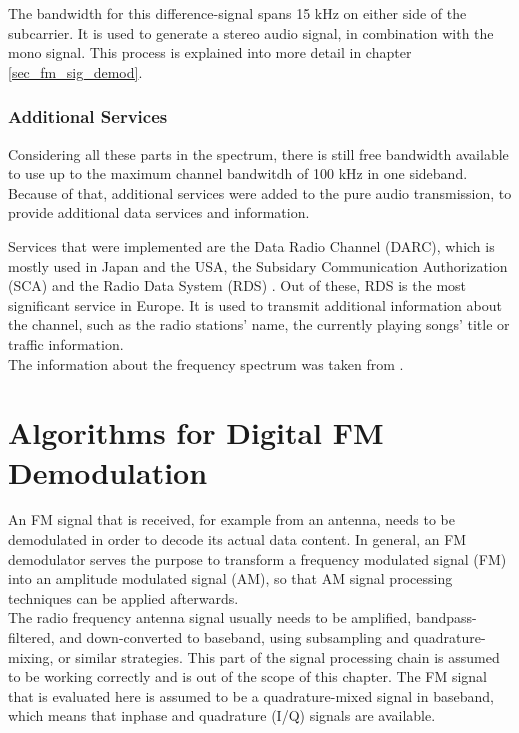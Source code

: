 The bandwidth for this difference-signal spans 15 kHz on either side of the subcarrier.
It is used to generate a stereo audio signal, in combination with the mono signal.
This process is explained into more detail in chapter \ref{sec_fm_sig_demod}.

\subsubsection{Additional Services}

Considering all these parts in the spectrum, there is still free bandwidth available to use up to the maximum channel bandwitdh of 100 kHz in one sideband.
Because of that, additional services were added to the pure audio transmission, to provide additional data services and information.

Services that were implemented are the Data Radio Channel (DARC), which is mostly used in Japan and the USA, the Subsidary Communication Authorization (SCA) and the Radio Data System (RDS) \cite{ref_rohde_u_schwarz}.
Out of these, RDS is the most significant service in Europe.
It is used to transmit additional information about the channel, such as the radio stations' name, the currently playing songs' title or traffic information.\\

\noindent
The information about the frequency spectrum was taken from \cite{ref_fm_broadcast_tutorial_and_basics}.

\section{Algorithms for Digital FM Demodulation}
\label{sec:algorithms-for-digital-fm-demodulation}

An FM signal that is received, for example from an antenna, needs to be demodulated in order to decode its actual data content.
In general, an FM demodulator serves the purpose to transform a frequency modulated signal (FM) into an amplitude modulated signal (AM), so that AM signal processing techniques can be applied afterwards.\\

The radio frequency antenna signal usually needs to be amplified, bandpass-filtered, and down-converted to baseband, using subsampling and quadrature-mixing, or similar strategies.
This part of the signal processing chain is assumed to be working correctly and is out of the scope of this chapter. %
The FM signal that is evaluated here is assumed to be a quadrature-mixed signal in baseband, which means that inphase and quadrature (I/Q) signals are available.

